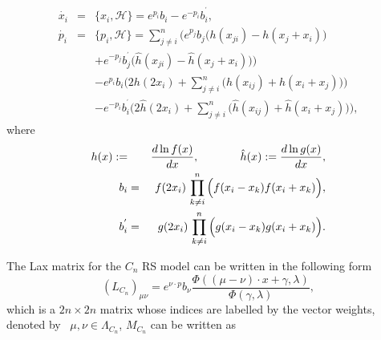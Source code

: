 \documentclass[a4paper,12pt]{article}
\begin{document}
\begin{eqnarray}
\dot{x_{i}} &=&\{x_{i},\mathcal{H}\}=e^{p_{i}}b_{i}-e^{-p_{i}}b_{i}^{^{
\prime }},  \label{mocn1} \\
\dot{p_{i}} &=&\{p_{i},\mathcal{H}\}=\sum_{j\neq i}^{n}\Big(e^{p_{j}}b_{j}
\big(h(x_{ji})-h(x_{j}+x_{i})\big)  \nonumber \\
&&+e^{-p_{j}}b_{j}^{^{\prime
}}\big(\hat{h}(x_{ji})-\hat{h}(x_{j}+x_{i})\big)
\Big)  \nonumber \\
&&-e^{p_{i}}b_{i}\Big(2h(2x_{i})+\sum_{j\neq i}^{n}\big(
h(x_{ij})+h(x_{i}+x_{j})\big)\Big)  \nonumber \\
&&-e^{-p_{i}}b_{i}^{^{\prime
}}\Big(2\hat{h}(2x_{i})+\sum_{j\neq i}^{n}\big(
\hat{h}(x_{ij})+\hat{h}(x_{i}+x_{j})\big)\Big),	 \label{mocn2}
\end{eqnarray}
where
\begin{eqnarray}
h(x):= &&\frac{d\ln f(x)}{dx},\mbox{$ \ \ \ \ \ \ \ \ \ \ \
$}\hat{h}(x):=
\frac{d\ln g(x)}{dx},  \nonumber \\
b_{i} &=&f(2x_{i})\,\prod_{k\neq
i}^{n}\Big(f(x_{i}-x_{k})f(x_{i}+x_{k})\Big), \\
b_{i}^{^{\prime }} &=&g(2x_{i})\,\prod_{k\neq i}^{n}\Big(
g(x_{i}-x_{k})g(x_{i}+x_{k})\Big).  \nonumber
\end{eqnarray}

The Lax matrix for the $C_{n}$ RS model can be written in
the following form
\begin{equation}
(L_{C_{n}})_{\mu \nu }=e^{\nu \cdot p}b_{\nu }\frac{\Phi
((\mu -\nu )\cdot x+\gamma ,\lambda )}{\Phi (\gamma ,\lambda
)},  \label{Lmatrix}
\end{equation}
which is a $2n\times 2n$ matrix whose indices are labelled
by the vector weights, denoted by \ $\mu ,\nu \in \Lambda
_{C_{n}}$, $M_{C_{n}}$ can be written as
\end{document}
